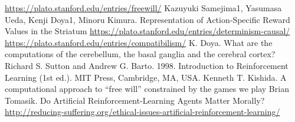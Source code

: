 \documentclass[a4paper]{article}
\begin{document}
\begin{thebibliography}{20}
 \url{https://plato.stanford.edu/entries/freewill/}
 Kazuyuki Samejima1, Yasumasa Ueda, Kenji Doya1, Minoru Kimura. Representation of Action-Specific Reward Values in the Striatum
 \url{https://plato.stanford.edu/entries/determinism-causal/}
 \url{https://plato.stanford.edu/entries/compatibilism/}
 K. Doya. What are the computations of the cerebellum, the basal ganglia and the cerebral cortex?
 Richard S. Sutton and Andrew G. Barto. 1998. Introduction to Reinforcement Learning (1st ed.). MIT Press, Cambridge, MA, USA.
 Kenneth T. Kishida. A computational approach to “free will” constrained by the games we play
 Brian Tomasik. Do Artificial Reinforcement-Learning Agents Matter Morally?
 \url{http://reducing-suffering.org/ethical-issues-artificial-reinforcement-learning/}

\end{thebibliography}
\end{document}
